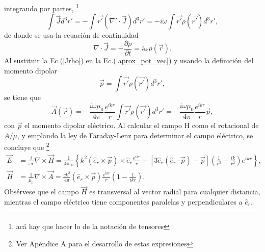 integrando por partes, \footnote{acá hay que hacer lo de la notación de tensores}
\begin{equation}
	\int\Vec{J}d^3r'=-\int \Vec{r'}(\nabla'\cdot\Vec{J})d^3r'=-i\omega\int \Vec{r'}\rho(\Vec{r'})d^3r',
	\label{Jrho}
\end{equation}
de donde se usa la ecuación de continuidad 
\begin{equation*}
    \nabla\cdot\Vec{J}=-\frac{\partial\rho}{\partial t}=i\omega\rho(\Vec{r}). 
\end{equation*}
Al sustituir la Ec.(\ref{Jrho}) en la Ec.(\ref{aprox_pot_vec}) y usando la definición del momento dipolar
\begin{equation*}
	\Vec{p}=\int \Vec{r'}\rho(\Vec{r'})d^3r',
\end{equation*}
se tiene que 
\begin{equation}
    \Vec{A}(\Vec{r})=-\frac{i\omega\mu_0}{4\pi}\frac{e^{ikr}}{r}\int \Vec{r'}\rho(\Vec{r'})d^3r'=-\frac{i\omega\mu_0}{4\pi}\frac{e^{ikr}}{r}\Vec{p} , 
    \label{A_dip}  
\end{equation}
con $\Vec{p}$ el momento dipolar eléctrico. Al calcular el campo H como el rotacional de $A/\mu$, y emplando la ley de Faraday-Lenz para determinar el campo eléctrico, se concluye que \footnote{Ver Apéndice A para el desarrollo de estas expresiones}
\begin{align}
	\Vec{E}&=\frac{i}{\omega\epsilon}\nabla\times\Vec{H}=\frac{1}{4\pi\epsilon_0}\left\{k^2(\hat{e}_r\times\Vec{p})\times\hat{e}_r\frac{e^{ikr}}{r}+[3\hat{e}_r(\hat{e}_r\cdot\Vec{p})-\Vec{p}]\left(\frac{1}{r^3}-\frac{ik}{r^2}\right)e^{ikr}\right\},\\
    \Vec{H}&=\frac{1}{\mu_0}\nabla\times\Vec{A}=\frac{ck^2}{4\pi}(\hat{e}_r\times\Vec{p})\frac{e^{ikr}}{r}\left(1-\frac{1}{ikr}\right).    
\end{align}
Obsérvese que el campo $\Vec{H}$ es transversal al vector radial para cualquier distancia, mientras el campo eléctrico tiene componentes paralelas y perpendiculares a $\hat{e}_r$.\\

